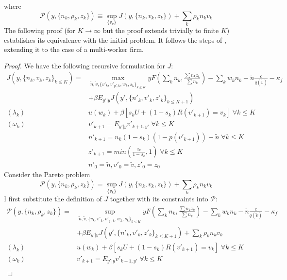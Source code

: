where
\[\mathcal{P}(y,\{n_k,\rho_k,z_k\}) \equiv \sup_{\{v_k\}} J(y,\{n_k,v_k,z_k\})+\sum_k \rho_k n_k v_k \]
The following proof (for $K\rightarrow\infty$ but the proof extends trivially to finite $K$) establishes its equivalence with the initial problem. It follows the steps of \textcite{balke2022}, extending it to the case of a multi-worker firm.
\begin{proof}
We have the following recursive formulation for $J$:
\begin{equation*}
    \begin{split}
 J(y,\{n_k,v_k,z_k\}_{k\leq K}) =
    & \max_{\tilde{n},\tilde{v},\{v'_k,v'_{y',k},w_{k},s_{k}\}_{k\leq K}} 
    yF(\sum_k n_k,\frac{\sum n_kz_k}{\sum n_k})-
    \sum_k w_kn_k
    -\tilde{n}\frac{c}{q(\tilde{v})}-\kappa_f \\
    & +\beta E_{y'|y} J(y',\{n'_k,v'_k,z'_k\}_{k\leq K+1}) \\
(\lambda_k) \: & u(w_k) + \beta [s_k U + (1-s_k)R(v'_{k+1})=v_k] \; \forall k\leq K \\
(\omega_k)    & v'_{k+1} = E_{y'|y} v'_{k+1,y'} \; \forall k\leq K \\
    & n'_{k+1} = n_k(1-s_k)(1-p(v'_{k+1}))+\tilde{n}\; \forall k\leq K \\
    & z'_{k+1} = min(\frac{z_k}{1-s_k},1)\; \forall k\leq K \\
    & n'_0 = \tilde{n}, v'_0 = \tilde{v}, z'_0 = z_0
    \end{split}
\end{equation*}
Consider the Pareto problem
\[\mathcal{P}(y,\{n_k,\rho_k,z_k\}) = \sup_{\{v_k\}} J(y,\{n_k,v_k,z_k\})+\sum_k \rho_k n_k v_k \]
I first substitute the definition of $J$ together with its constraints into $\mathcal{P}$:
\begin{equation*}
    \begin{split}
 \mathcal{P}(y,\{n_k,\rho_k,z_k\}) =
    & \sup_{\tilde{n},\tilde{v},\{v_k,v'_{k},v'_{y',k},w_{k},s_{k}\}_{k\leq K}} 
    yF(\sum_k n_k,\frac{\sum n_kz_k}{\sum n_k})-
    \sum_k w_kn_k
    -\tilde{n}\frac{c}{q(\tilde{v})}-\kappa_f \\
    & +\beta E_{y'|y} J(y',\{n'_k,v'_k,z'_k\}_{k\leq K+1}) + \sum_k \rho_k n_kv_k  \\
(\lambda_k) \: & u(w_k) + \beta [s_k U + (1-s_k)R(v'_{k+1})=v_k] \; \forall k\leq K \\
(\omega_k) \:   & v'_{k+1} = E_{y'|y} v'_{k+1,y'} \; \forall k\leq K \\

\end{split}
\end{equation*}
\end{proof}
